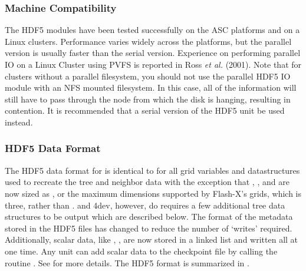 \subsubsection{Machine Compatibility}
The HDF5 modules have been tested successfully on the ASC platforms
and on a Linux clusters.  Performance varies widely across the
platforms, but the parallel version is usually faster than the serial
version.  Experience on performing parallel IO on a Linux Cluster
using PVFS is reported in Ross {\it et al.} (2001).  Note that for
clusters without a parallel filesystem, you should not use the
parallel HDF5 IO module with an NFS mounted filesystem.  In this
case, all of the information will still have to pass through the node
from which the disk is hanging, resulting in contention.  It is
recommended that a serial version of the HDF5 unit be used instead. 

\subsubsection{HDF5 Data Format}\label{Sec:Data Format}
The HDF5 data format for \flashx is identical to \flashx for all
grid variables and datastructures used to recreate the tree and
neighbor data with the exception that , , and 
are now sized as , or the maximum dimensions supported by Flash-X's 
grids, which is three, rather than .
 and \Paramesh4dev, however, do requires a few additional tree data structures
to be output which are described below.  The format of the metadata stored in the HDF5 files
has changed to reduce the number of `writes' required. Additionally,
scalar data, like , \etc, are now stored in a
linked list and written all at one time.  Any unit can add scalar
data to the checkpoint file by calling the routine
.  See
 for more details.  The \flashx HDF5 format is
summarized in .


